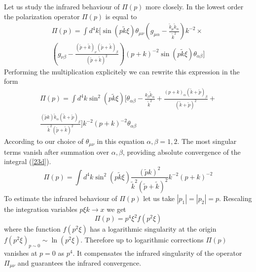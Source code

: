 \documentclass[a4paper,12pt]{article}
\begin{document}
Let us study the infrared behaviour of $\Pi(p)$ more closely. In the 
 lowest order the polarization operator $\Pi(p)$ is equal to
\begin{eqnarray}
\Pi(p)= \int d^4k[\sin(p \tilde{k} \xi) \theta_{\mu \nu}(g_{\mu \alpha}- 
 \frac{\tilde{k}_{\mu} \tilde{k}_{\alpha}}{\tilde{k}^2})k^{-2} 
\times\nonumber\\(g_{\nu \beta}- \frac{(\tilde{p}+ 
\tilde{k})_{\nu}(\tilde{p}+ 
\tilde{k})_{\beta}}{(\tilde{p}+\tilde{k})^2})(p+k)^{-2} \sin(p \tilde{k} 
\xi) \theta_{\alpha \beta}] \label{23c} \end{eqnarray} Performing the 
multiplication explicitely we can rewrite this expression in the form 
\begin{eqnarray}
\Pi(p)= \int d^4k \sin^2(p \tilde{k} \xi)[\theta_{\alpha \beta}- 
\frac{k_{\beta} \tilde{k}_{\alpha}}{\tilde{k}^2}+ 
\frac{(p+k)_{\alpha}(\tilde{k}+ \tilde{p})_{\beta}}{(\tilde{k}+ 
\tilde{p})^2}+\nonumber\\ 
\frac{(\tilde{p}k) \tilde{k}_{\alpha}(\tilde{k}+\tilde{p})_{\beta}}
{\tilde{k}^2(\tilde{p}+\tilde{k})^2}]k^{-2}(p+k)^{-2} \theta_{\alpha 
\beta}
\label{23d}
\end{eqnarray}
According to our choice of $\theta_{\mu \nu}$ in this equation $\alpha, 
 \beta=1,2$. The most singular terms vanish after summation over $\alpha, 
\beta$, providing absolute convergence of the integral (\ref{23d}).
\begin{equation}
\Pi(p)= \int d^4k \sin^2(p \tilde{k} \xi) 
\frac{(\tilde{p}k)^2}{\tilde{k}^2(\tilde{p}+\tilde{k})^2}
k^{-2}(p+k)^{-2}
\label{23e}
\end{equation}
To estimate the infrared behaviour of $\Pi(p)$ let us take 
 $|p_1|=|p_2|=p$. Rescaling the integration variables 
$p \xi k \rightarrow x$ we get
\begin{equation}
\Pi(p)=p^4 \xi^2f(p^2 \xi)
\label{23f}
\end{equation}
where the function $f(p^2 \xi)$ has a logarithmic singularity at the 
origin $f(p^2 \xi)_{p \sim 0} \sim \ln(p^2 \xi)$. Therefore up to 
 logarithmic corrections $\Pi(p)$ vanishes at $p=0$ as $p^4$. It 
 compensates the infrared singularity of the operator $\Pi_{\mu \nu}$ and 
guarantees the infrared convergence. 
\end{document}
